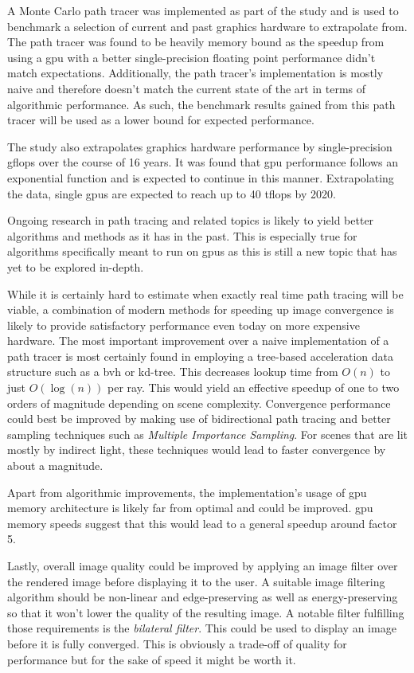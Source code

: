 \documentclass[
  twoside,
  11pt, a4paper,
  footinclude=true,
  headinclude=true,
  cleardoublepage=empty
]{scrreprt}
\begin{document}
A Monte Carlo path tracer was implemented as part of the study and is used to benchmark a selection
of current and past graphics hardware to extrapolate from. The path tracer was found to be heavily
memory bound as the speedup from using a \ac{gpu} with a better single-precision floating
point performance didn't match expectations. Additionally, the path tracer's implementation is
mostly naive and therefore doesn't match the current state of the art in terms of algorithmic
performance. As such, the benchmark results gained from this path tracer will be used as a lower
bound for expected performance.

The study also extrapolates graphics hardware performance by single-precision \ac{gflops} over the
course of 16 years. It was found that \ac{gpu} performance follows an exponential function and is
expected to continue in this manner. Extrapolating the data, single \acp{gpu} are expected to reach up to
40 \ac{tflops} by 2020.

Ongoing research in path tracing and related topics is likely to yield better algorithms and
methods as
it has in the past. This is especially true for algorithms specifically meant to run on \acp{gpu}
as this is still a new topic that has yet to be explored in-depth.

While it is certainly hard to estimate when exactly real time path tracing will be viable, a
combination of modern methods for speeding up image convergence is likely to provide satisfactory
performance even today on more expensive hardware. The most important improvement over a naive
implementation of a path tracer
is most certainly found in employing a tree-based acceleration data structure such as a \ac{bvh} or kd-tree.
This decreases
lookup time from \(O(n)\) to just \(O(\log(n))\) per ray. This would yield an effective speedup of
one to two orders of magnitude depending on scene complexity.
Convergence performance could best be improved by making use of bidirectional path tracing and
better sampling techniques such as \textit{Multiple Importance Sampling}. For scenes that are lit
mostly by indirect light, these techniques would lead to faster convergence by about a magnitude.

Apart from algorithmic improvements, the implementation's usage of \ac{gpu} memory architecture
is likely far from optimal and could be improved. \ac{gpu} memory speeds suggest that this would
lead to a general speedup around factor 5.

Lastly, overall image quality could be improved by applying an image filter over the rendered image
before displaying it to the user. A suitable image filtering algorithm should be non-linear and
edge-preserving as well as energy-preserving so that it won't lower the quality of the resulting
image. A notable filter fulfilling those requirements is the \textit{bilateral filter}. This could
be used to display an image before it is fully converged. This is obviously a trade-off of quality
for performance but for the sake of speed it might be worth it.
\end{document}
